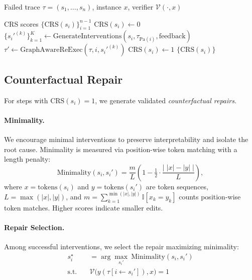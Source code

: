 \documentclass{article}
\theoremstyle{plain}
\theoremstyle{definition}
\theoremstyle{remark}
\begin{document}
\begin{algorithm}[tb]
   \caption{Causal Responsibility Scoring}
   \label{alg:crs}
\begin{algorithmic}
    Failed trace $\tau = (s_1, \ldots, s_n)$, instance $x$, verifier $\mathcal{V}(\cdot, x)$

    CRS scores $\{\text{CRS}(s_i)\}_{i=1}^{n-1}$
       \STATE $\text{CRS}(s_i) \leftarrow 0$
      \STATE $\{s_i'^{(k)}\}_{k=1}^K \leftarrow \text{GenerateInterventions}(s_i, \tau_{\mathrm{Pa}(i)}, \text{feedback})$
           \STATE $\tau' \leftarrow \text{GraphAwareReExec}(\tau, i, s_i'^{(k)})$
               \STATE $\text{CRS}(s_i) \leftarrow 1$
           \ENDIF
       \ENDFOR
   \ENDFOR
    $\{\text{CRS}(s_i)\}$
\end{algorithmic}
\end{algorithm}

\subsection{Counterfactual Repair}

For steps with $\text{CRS}(s_i)=1$, we generate validated \emph{counterfactual repairs}.

\paragraph{Minimality.}
We encourage minimal interventions to preserve interpretability and isolate the root cause. Minimality is measured via position-wise token matching with a length penalty:
\begin{equation}
    \text{Minimality}(s_i, s_i') =
    \frac{m}{L}\left(1 - \tfrac{1}{2}\cdot\frac{\left|\;|x|-|y|\;\right|}{L}\right),
\end{equation}
where $x=\text{tokens}(s_i)$ and $y=\text{tokens}(s_i')$ are token sequences, $L=\max(|x|,|y|)$, and $m=\sum_{k=1}^{\min(|x|,|y|)} \mathbb{I}[x_k = y_k]$ counts position-wise token matches. Higher scores indicate smaller edits.

\paragraph{Repair Selection.}
Among successful interventions, we select the repair maximizing minimality:
\begin{equation}
\begin{aligned}
s_i^\star 
&= \arg\max_{s_i'} \ \text{Minimality}(s_i, s_i') \\
\text{s.t.} \quad 
&\mathcal{V}\!\big(y(\tau[i \leftarrow s_i']), x\big)=1
\end{aligned}
\end{equation}
\end{document}
